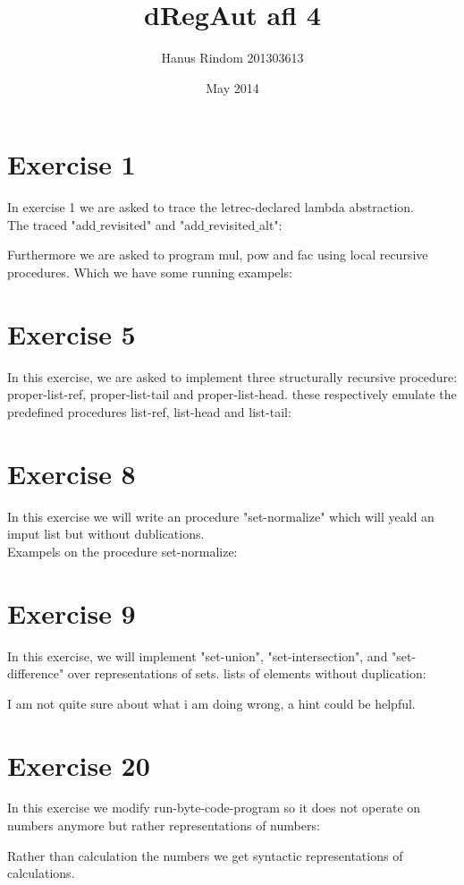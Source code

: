 \documentclass{article}
\title{dRegAut afl 4}
\author{Hanus Rindom 201303613}
\date{May 2014}
\begin{document}
\maketitle

\section*{Exercise 1}
In exercise 1 we are asked to trace the letrec-declared lambda abstraction.\\
The traced "add$\_$revisited" and "add$\_$revisited$\_$alt":



Furthermore we are asked to program mul, pow and fac using local recursive procedures. Which we have some running exampels:



\section*{Exercise 5}
In this exercise, we are asked to implement three structurally
recursive procedure: proper-list-ref, proper-list-tail and proper-list-head. these respectively emulate the predefined procedures list-ref, list-head and list-tail:


\section*{Exercise 8}
In this exercise we will write an procedure "set-normalize" which will yeald an imput list but without dublications.\\
Exampels on the procedure set-normalize:


\section*{Exercise 9}
In this exercise, we will implement "set-union", "set-intersection", and "set-difference" over representations of sets.
lists of elements without duplication:

I am not quite sure about what i am doing wrong, a hint could be helpful.
\section*{Exercise 20}
In this exercise we modify run-byte-code-program so it does not operate on numbers anymore but rather representations of numbers:



Rather than calculation the numbers we get syntactic representations of calculations.
\end{document}
